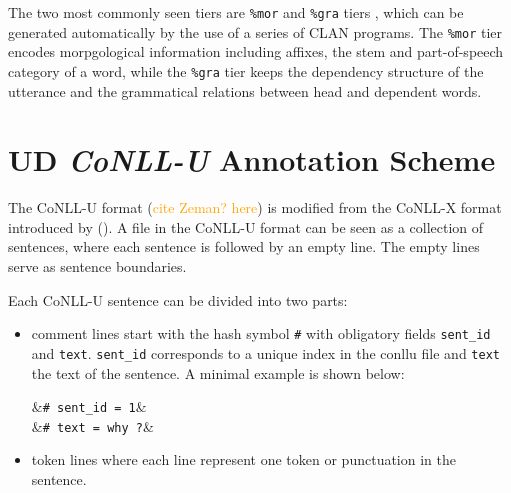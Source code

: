 The two most commonly seen tiers are \texttt{\%mor} and \texttt{\%gra} tiers , which can be generated automatically by the use of a series of CLAN programs. The \texttt{\%mor} tier encodes morpgological information including affixes, the stem and part-of-speech category of a word, while the \texttt{\%gra} tier keeps the dependency structure of the utterance and the grammatical relations between head and dependent words.

\newcommand{\conllu}[1]{&\footnotesize\texttt{#1}}
\newcommand{\tab}{&\hspace{0.1em}}
\setlength{\abovedisplayskip}{3pt}
\setlength{\belowdisplayskip}{3pt}
\vspace{-1em}
\section{UD \emph{CoNLL-U} Annotation Scheme}\label{sec:conllu}

The CoNLL-U format (\textcolor{orange}{cite Zeman? here}) is modified from the CoNLL-X format introduced by (\cite{buchholz-marsi-2006-conll}). A file in the CoNLL-U format can be seen as a collection of sentences, where each sentence is followed by an empty line. The empty lines serve as sentence boundaries.

Each CoNLL-U sentence can be divided into two parts:
\begin{itemize}
	\item comment lines  start with the hash symbol \texttt{\#} with obligatory fields \texttt{sent\_id} and \texttt{text}. \texttt{sent\_id} corresponds to a unique index in the conllu file and \texttt{text} the text of the sentence. A minimal example is shown below:
	\begin{flalign*}
	\conllu{\# sent\_id = 1}&\\
	\conllu{\# text = why ?}&
	\end{flalign*}
	\item token lines where each line represent one token or punctuation in the sentence.
\end{itemize}
